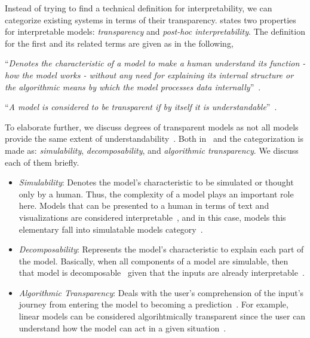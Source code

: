 Instead of trying to find a technical definition for interpretability, we can categorize existing systems in terms of their transparency.
\cite{TheMythosOfModelInterpretability_Lipton} states two properties for interpretable models: \emph{transparency} and \emph{post-hoc interpretability}. The definition for the first and its related terms are given as in the following,
\begin{definition}
    “\emph{Denotes the characteristic of a model to make a human understand its function - how the model works - without any need for explaining its internal structure or the algorithmic means by which the model processes data internally}”~\parencite{MethodsForInterpretingAndUnderstandingDNNs_Montavon,XAIConceptsTaxonomies_Arrieta}.
\end{definition}
\begin{definition}
    “\emph{A model is considered to be transparent if by itself it is understandable}”~\parencite{XAIConceptsTaxonomies_Arrieta}.
\end{definition}
To elaborate further, we discuss degrees of transparent models as not all models provide the same extent of understandability~\parencite{XAIConceptsTaxonomies_Arrieta}. Both in~\cite{TheMythosOfModelInterpretability_Lipton} and \cite{XAIConceptsTaxonomies_Arrieta} the
categorization is made as: \emph{simulability}, \emph{decomposability}, and \emph{algorithmic transparency}. We discuss each of them briefly.
\begin{itemize}
    \item \emph{Simulability}: Denotes the model’s characteristic to be simulated or thought only by a human. Thus, the complexity of a model
          plays an important role here. Models that can be presented to a human in terms of text and visualizations are considered
          interpretable~\parencite{WhyShouldITrustYou_Riberio}, and in this case, models this elementary fall into simulatable models
          category~\parencite{XAIConceptsTaxonomies_Arrieta, RegressionShrinkage_Tibshirani}.
    \item \emph{Decomposability}: Represents the model’s characteristic to explain each part of the model. Basically, when all components of a model
          are simulable, then that model is decomposable~\parencite{TheMythosOfModelInterpretability_Lipton} given that the inputs are already interpretable~\parencite{XAIConceptsTaxonomies_Arrieta}.
    \item \emph{Algorithmic Transparency}: Deals with the user’s comprehension of the input’s journey from entering the model to becoming a prediction~\parencite{TheMythosOfModelInterpretability_Lipton, XAIConceptsTaxonomies_Arrieta}. For example, linear models can be considered algorihtmically transparent since the user can understand how the model can act in a given situation~\parencite{AnIntroductionToStatisticalLearning_Gareth}.
\end{itemize}
